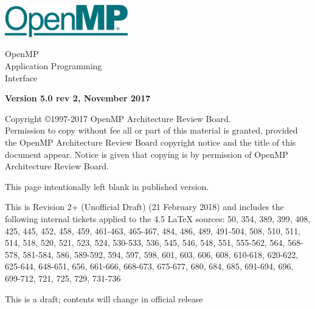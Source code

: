 
  \begin{titlepage}
    \begin{flushleft}
     \hspace{-6em} \includegraphics[width=0.4\textwidth]{openmp-logo.png}
    \end{flushleft}

    \begin{adjustwidth}{-0.75in}{0in}
    \begin{center}
      \Huge
      \textsf{OpenMP\\Application Programming\\Interface}

      \vspace{0.5in}\textsf{    }\vspace{-0.7in}
      \normalsize

      \vspace{1.0in}

      \textbf{Version 5.0 rev 2, November 2017}
    \end{center}
    \end{adjustwidth}

    \vspace{3.0in}

\begin{adjustwidth}{0pt}{1em}\setlength{\parskip}{0.25\baselineskip}%
Copyright \copyright 1997-2017 OpenMP Architecture Review Board.\\
Permission to copy without fee all or part of this material is granted,
provided the OpenMP Architecture Review Board copyright notice and
the title of this document appear. Notice is given that copying is by
permission of OpenMP Architecture Review Board.\end{adjustwidth}

  \end{titlepage}


\clearpage
\thispagestyle{empty}
\phantom{a}
This page intentionally left blank in published version.

This is Revision 2+ (Unofficial Draft) (21 February 2018) and
includes the following internal tickets applied to the 4.5 LaTeX sources:
50, 354, 389, 399, 408, 425, 445, 452, 458, 459, 461-463, 465-467, 484, 
486, 489, 491-504, 508, 510, 511, 514, 518, 520, 521, 523, 524, 530-533, 
536, 545, 546, 548, 551, 555-562, 564, 568-578, 581-584, 586, 589-592, 
594, 597, 598, 601, 603, 606, 608, 610-618, 620-622, 625-644, 648-651, 
656, 661-666, 668-673, 675-677, 680, 684, 685, 691-694, 696, 699-712, 
721, 725, 729, 731-736

This is a draft; contents will change in official release

\vfill

